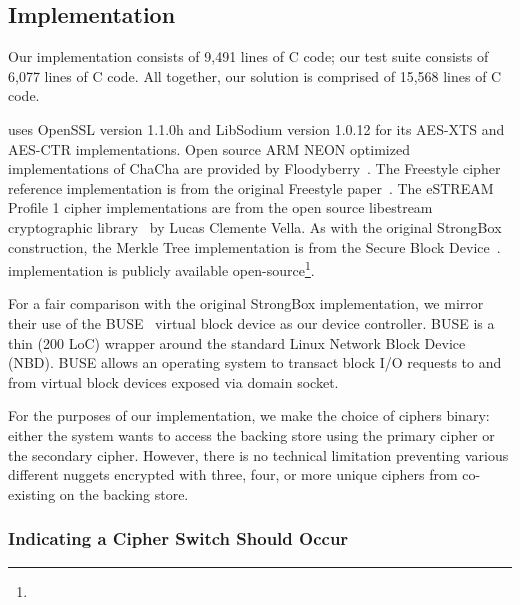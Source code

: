 \subsection{Implementation}

Our \SYSTEM{} implementation consists of 9,491 lines of C code; our test suite
consists of 6,077 lines of C code. All together, our solution is comprised of
15,568 lines of C code.

\SYSTEM{} uses OpenSSL version 1.1.0h and LibSodium version 1.0.12 for its
AES-XTS and AES-CTR implementations. Open source ARM NEON optimized
implementations of ChaCha are provided by Floodyberry~\cite{Floodyberry}. The
Freestyle cipher reference implementation is from the original Freestyle
paper~\cite{Freestyle}. The eSTREAM Profile 1 cipher implementations are from
the open source libestream cryptographic library~\cite{libestream} by Lucas
Clemente Vella. As with the original StrongBox construction, the Merkle Tree
implementation is from the Secure Block Device~\cite{SBD}. \SYSTEM{}
implementation is publicly available open-source\footnote{\SystemURI}.

For a fair comparison with the original StrongBox implementation, we mirror
their use of the BUSE~\cite{BUSE} virtual block device as our device controller.
BUSE is a thin (200 LoC) wrapper around the standard Linux Network Block Device
(NBD). BUSE allows an operating system to transact block I/O requests to and
from virtual block devices exposed via domain socket.

For the purposes of our implementation, we make the choice of ciphers binary:
either the system wants \SYSTEM{} to access the backing store using the primary
cipher or the secondary cipher. However, there is no technical limitation
preventing various different nuggets encrypted with three, four, or more unique
ciphers from co-existing on the backing store. 

\subsubsection{Indicating a Cipher Switch Should Occur}

